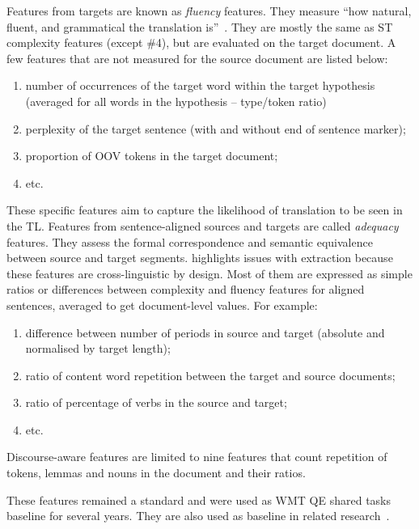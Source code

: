 Features from targets are known as \textit{fluency} features. They measure ``how natural, fluent, and grammatical the translation is''~\cite[p.53]{Specia2018a}. They are mostly the same as ST complexity features (except \#4), but are evaluated on the target document. A few features that are not measured for the source document are listed below:
\begin{enumerate}\compresslist{}
	\item number of occurrences of the target word within the target hypothesis (averaged for all words in the hypothesis -- type/token ratio)
	\item perplexity of the target sentence (with and without end of sentence marker);
	\item proportion of \gls{OOV} tokens in the target document;
	\item etc.
\end{enumerate}
These specific features aim to capture the likelihood of translation to be seen in the TL.
\label{pg:quest_adequacy_feats}
Features from sentence-aligned sources and targets are called \textit{adequacy} features. They assess the formal correspondence and semantic equivalence between source and target segments. \citet{Specia2018a} highlights issues with extraction because these features are cross-linguistic by design. Most of them are expressed as simple ratios or differences between complexity and fluency features for aligned sentences, averaged to get document-level values. For example:

\begin{enumerate}\compresslist{}
	\item difference between number of periods in source and target (absolute and normalised by target length);
	\item ratio of content word repetition between the target and source documents;
	\item ratio of percentage of verbs in the source and target;
	\item etc.
\end{enumerate}

Discourse-aware features are limited to nine features that count repetition of tokens, lemmas and nouns in the document and their ratios. 

These features remained a standard and were used as WMT QE shared tasks baseline for several years. They are also used as baseline in related research~\cite[e.g.][including for HTQE in~\citet{Yuan2016} and subsequent publications]{Kozlova2016}.

